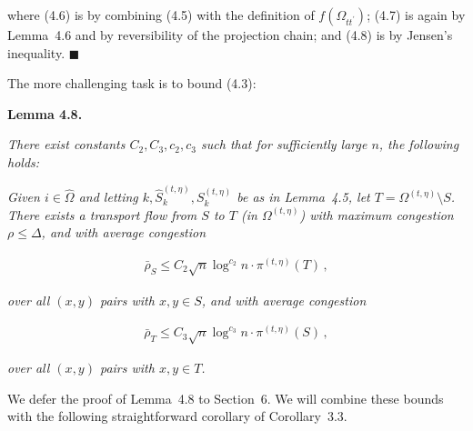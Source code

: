\documentclass[10pt,a4paper]{article}
\begin{document}
where (4.6) is by combining (4.5) with the definition of $f(\Omega_{tt^{\prime}})$; (4.7) is again by Lemma 4.6 and by reversibility of the projection chain;
and (4.8) is by Jensen’s inequality.
\ensuremath{\blacksquare}\par





The more challenging task is to bound (4.3):\par





\par\medskip\noindent\textbf{\textbf{Lemma 4.8}\textbf{.}}\par



\emph{There exist constants $C_{2},C_{3},c_{2},c_{3}$ such that for sufficiently large $n$, the following holds:}\par




\emph{Given $i\in\hat{\Omega}$ and letting $k,\hat{S}_{k}^{(t,\eta)},S_{k}^{(t,\eta)}$ be as in Lemma 4.5, let $T=\Omega^{(t,\eta)}\setminus S$. There exists a transport flow from $S$ to $T$ (in $\Omega^{(t,\eta)}$) with maximum congestion $\rho\leq\Delta$, and with average congestion}\par


\[\begin{gathered}
\bar{\rho}_{S}\leq C_{2}\sqrt{n}\log^{c_{2}}n\cdot\pi^{(t,\eta)}(T)\,,
\end{gathered}\]




\emph{over all $(x,y)$ pairs with $x,y\in S$, and with average congestion}\par


\[\begin{gathered}
\bar{\rho}_{T}\leq C_{3}\sqrt{n}\log^{c_{3}}n\cdot\pi^{(t,\eta)}(S)\,,
\end{gathered}\]


\emph{over all $(x,y)$ pairs with $x,y\in T$.}\par






We defer the proof of Lemma 4.8 to Section 6.
We will combine these bounds with the following straightforward corollary of Corollary 3.3.\par
\end{document}
